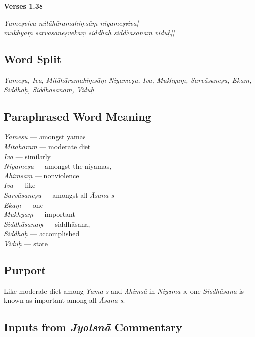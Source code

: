 \noindent \textbf{Verses 1.38}

\begin{shloka}
\textit{Yameṣviva mitāhāramahiṃsāṃ niyameṣviva|\\
mukhyaṃ sarvāsaneṣvekaṃ siddhāḥ siddhāsanaṃ viduḥ||}
\end{shloka}

\subsection*{Word Split}

\textit{Yameṣu, Iva, Mitāhāramahiṃsāṃ Niyameṣu, Iva, Mukhyaṃ, Sarvāsaneṣu, Ekam, Siddhāḥ, Siddhāsanam, Viduḥ}

\subsection*{Paraphrased Word Meaning}


\begin{multicols}{2}
\textit{Yameṣu} --- amongst yamas \\
\textit{Mitāhāram} --- moderate diet  \\ 
\textit{Iva} --- similarly   \\
\textit{Niyameṣu} ---  amongst the niyamas,  \\
\textit{Ahiṃsāṃ} --- nonviolence  \\
\textit{Iva} ---  like  \\
\textit{Sarvāsaneṣu} --- amongst all \textit{Āsana-s}   \\
\textit{Ekaṃ} --- one  \\
\textit{Mukhyaṃ} --- important  \\
\textit{Siddhāsanaṃ} --- siddhāsana,  \\
\textit{Siddhāḥ} --- accomplished   \\
\textit{Viduḥ} --- state
\end{multicols}

\subsection*{Purport}

Like moderate diet  among \textit{Yama-s} and \textit{Ahimsā} in \textit{Niyama-s}, one \textit{Siddhāsana} is known as important among all \textit{Āsana-s}. 

\subsection*{Inputs from \textit{Jyotsnā} Commentary}

